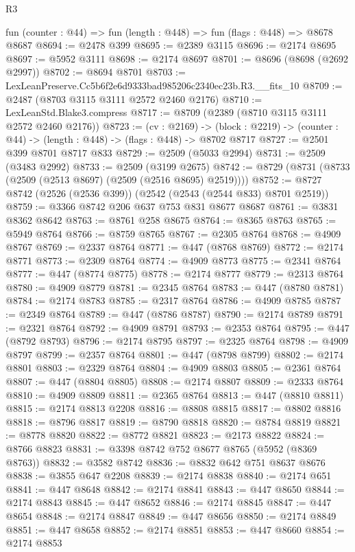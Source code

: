 \begin{lexlean}{R3}
\begin{coremodule}
  fun (counter : @44) => fun (length : @448) => fun (flags : @448) => @8678 @8687
@8694 := @2478 @399
@8695 := @2389 @3115
@8696 := @2174 @8695
@8697 := @5952 @3111
@8698 := @2174 @8697
@8701 := @8696 (@8698 (@2692 @2997))
@8702 := @8694 @8701
@8703 := LexLeanPreserve.Cc5b6f2e6d9333bad985206c2340ec23b.R3.__fits_10
@8709 := @2487 (@8703 @3115 @3111 @2572 @2460 @2176)
@8710 := LexLeanStd.Blake3.compress
@8717 := @8709 (@2389 (@8710 @3115 @3111 @2572 @2460 @2176))
@8723 := (cv : @2169) ->
  (block : @2219) -> (counter : @44) -> (length : @448) -> (flags : @448) -> @8702 @8717
@8727 := @2501 @399 @8701 @8717 @833
@8729 := @2509 (@5033 @2994)
@8731 := @2509 (@3483 @2992)
@8733 := @2509 (@3199 @2675)
@8742 := @8729 (@8731 (@8733 (@2509 (@2513 @8697) (@2509 (@2516 @8695) @2519))))
@8752 := @8727 @8742 (@2526 (@2536 @399)) (@2542 (@2543 (@2544 @833) @8701 @2519))
@8759 := @3366 @8742 @206 @637 @753 @831 @8677 @8687
@8761 := @3831 @8362 @8642
@8763 := @8761 @258 @8675
@8764 := @8365 @8763
@8765 := @5949 @8764
@8766 := @8759 @8765
@8767 := @2305 @8764
@8768 := @4909 @8767
@8769 := @2337 @8764
@8771 := @447 (@8768 @8769)
@8772 := @2174 @8771
@8773 := @2309 @8764
@8774 := @4909 @8773
@8775 := @2341 @8764
@8777 := @447 (@8774 @8775)
@8778 := @2174 @8777
@8779 := @2313 @8764
@8780 := @4909 @8779
@8781 := @2345 @8764
@8783 := @447 (@8780 @8781)
@8784 := @2174 @8783
@8785 := @2317 @8764
@8786 := @4909 @8785
@8787 := @2349 @8764
@8789 := @447 (@8786 @8787)
@8790 := @2174 @8789
@8791 := @2321 @8764
@8792 := @4909 @8791
@8793 := @2353 @8764
@8795 := @447 (@8792 @8793)
@8796 := @2174 @8795
@8797 := @2325 @8764
@8798 := @4909 @8797
@8799 := @2357 @8764
@8801 := @447 (@8798 @8799)
@8802 := @2174 @8801
@8803 := @2329 @8764
@8804 := @4909 @8803
@8805 := @2361 @8764
@8807 := @447 (@8804 @8805)
@8808 := @2174 @8807
@8809 := @2333 @8764
@8810 := @4909 @8809
@8811 := @2365 @8764
@8813 := @447 (@8810 @8811)
@8815 := @2174 @8813 @2208
@8816 := @8808 @8815
@8817 := @8802 @8816
@8818 := @8796 @8817
@8819 := @8790 @8818
@8820 := @8784 @8819
@8821 := @8778 @8820
@8822 := @8772 @8821
@8823 := @2173 @8822
@8824 := @8766 @8823
@8831 := @3398 @8742 @752 @8677 @8765 (@5952 (@8369 @8763))
@8832 := @3582 @8742
@8836 := @8832 @642 @751 @8637 @8676
@8838 := @3855 @647 @2208
@8839 := @2174 @8838
@8840 := @2174 @651
@8841 := @447 @8648
@8842 := @2174 @8841
@8843 := @447 @8650
@8844 := @2174 @8843
@8845 := @447 @8652
@8846 := @2174 @8845
@8847 := @447 @8654
@8848 := @2174 @8847
@8849 := @447 @8656
@8850 := @2174 @8849
@8851 := @447 @8658
@8852 := @2174 @8851
@8853 := @447 @8660
@8854 := @2174 @8853

\end{coremodule}
\end{lexlean}
